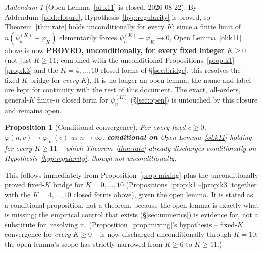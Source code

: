 \documentclass[11pt]{article}
\newtheorem{proposition}{Proposition}
\theoremstyle{remark}
\newtheorem{addendum}{Addendum}
\newcommand{\phiinf}{\varphi_\infty}
\begin{document}
\begin{addendum}[Open Lemma~\ref{ol:k11} is closed, 2026-08-22]
\label{add:openlemma-closed}
By Addendum~\ref{add:closure}, Hypothesis~\ref{hyp:regularity} is
proved, so Theorem~\ref{thm:rate} holds unconditionally for every $K$;
since a finite limit of $n(\psi_n^{(K)}-\varphi_K)$ elementarily forces
$\psi_n^{(K)}-\varphi_K\to0$, Open Lemma~\ref{ol:k11} above is now
\textbf{PROVED, unconditionally, for every fixed integer $K\ge0$} (not
just $K\ge11$; combined with the unconditional
Propositions~\ref{prop:k1}--\ref{prop:k3} and the $K=4,\dots,10$ closed
forms of \S\ref{sec:bridge}, this resolves the fixed-$K$ bridge for
\emph{every} $K$). It is no longer an open lemma; the name and label
are kept for continuity with the rest of this document. The exact,
all-orders, general-$K$ finite-$n$ closed form for $\psi_n^{(K)}$
(\S\ref{sec:open}) is untouched by this closure and remains open.
\end{addendum}

\begin{proposition}[Conditional convergence]
\label{prop:conditional}
For every fixed $c\ge0$, $\varphi(n,c)\to\phiinf(c)$ as $n\to\infty$,
\textbf{conditional on} Open Lemma~\ref{ol:k11} holding for every
$K\ge11$ -- which Theorem~\ref{thm:rate} already discharges
conditionally on Hypothesis~\ref{hyp:regularity}, though not
unconditionally.
\end{proposition}

This follows immediately from Proposition~\ref{prop:mixing} plus the
unconditionally proved fixed-$K$ bridge for $K=0,\dots,10$
(Propositions~\ref{prop:k1}--\ref{prop:k3} together with the $K=4,\dots,10$
closed forms above), given the open lemma. It is stated as a conditional
proposition, not a theorem, because the open lemma is exactly what is
missing; the empirical control that exists (\S\ref{sec:numerics}) is
evidence for, not a substitute for, resolving it. (Proposition~\ref{prop:mixing}'s
hypothesis -- fixed-$K$ convergence for \emph{every} $K\ge0$ -- is now
discharged unconditionally through $K=10$; the open lemma's scope has
strictly narrowed from $K\ge6$ to $K\ge11$.)
\end{document}
